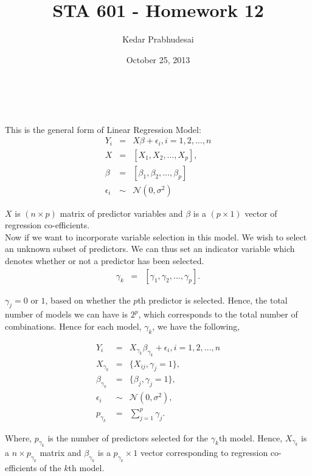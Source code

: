 \documentclass{article}
\title{STA 601 - Homework 12}
\author{Kedar Prabhudesai}
\date{October 25, 2013}
\begin{document}
\maketitle

\\

\\

This is the general form of Linear Regression Model:
\begin{eqnarray*}
Y_i &=& X\beta + \epsilon_i, i = 1,2,\ldots,n\\
X &=& [X_1,X_2,\ldots,X_p],\\
\beta &=& [\beta_1,\beta_2,\ldots,\beta_p]\\
\epsilon_i &\sim& \mathcal{N}(0,\sigma^2)
\end{eqnarray*}

$X$ is $(n \times p)$ matrix of predictor variables and $\beta$ is a $(p \times 1)$ vector of regression co-efficients.\\

Now if we want to incorporate variable selection in this model. We wish to select an unknown subset of predictors. We can thus set an indicator variable which denotes whether or not a predictor has been selected.
\begin{eqnarray*}
\gamma_k &=& [\gamma_1,\gamma_2,\ldots,\gamma_p].
\end{eqnarray*} 

$\gamma_j = 0$ or $1$, based on whether the $p$th predictor is selected. Hence, the total number of models we can have is $2^p$, which corresponds to the total number of combinations. Hence for each model, $\gamma_k$, we have the following,

\begin{eqnarray*}
Y_i &=& X_{\gamma_k}\beta_{\gamma_k} + \epsilon_i, i = 1,2,\ldots,n\\
X_{\gamma_k} &=& \{X_{ij},\gamma_j = 1\},\\
\beta_{\gamma_k} &=& \{\beta_j, \gamma_j = 1\},\\
\epsilon_i &\sim& \mathcal{N}(0,\sigma^2),\\
p_{\gamma_k} &=& \sum_{j = 1}^{p}{\gamma_j}.
\end{eqnarray*}

Where, $p_{\gamma_k}$ is the number of predictors selected for the $\gamma_k$th model. Hence, $X_{\gamma_k}$ is a $n \times p_{\gamma_k}$ matrix and $\beta_{\gamma_k}$ is a $p_{\gamma_k} \times 1$ vector corresponding to regression co-efficients of the $k$th model.\\
\end{document}
